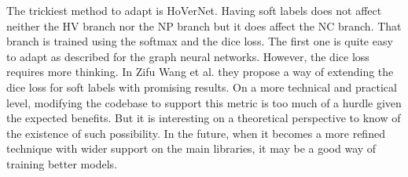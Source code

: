 The trickiest method to adapt is HoVerNet. Having soft labels does not affect neither the HV branch nor the NP branch but it does affect the NC branch. That branch is trained using the softmax and the dice loss. The first one is quite easy to adapt as described for the graph neural networks. However, the dice loss requires more thinking. In Zifu Wang et al. \cite{wang2023dice} they propose a way of extending the dice loss for soft labels with promising results. On a more technical and practical level, modifying the codebase to support this metric is too much of a hurdle given the expected benefits. But it is interesting on a theoretical perspective to know of the existence of such possibility. In the future, when it becomes a more refined technique with wider support on the main libraries, it may be a good way of training better models.